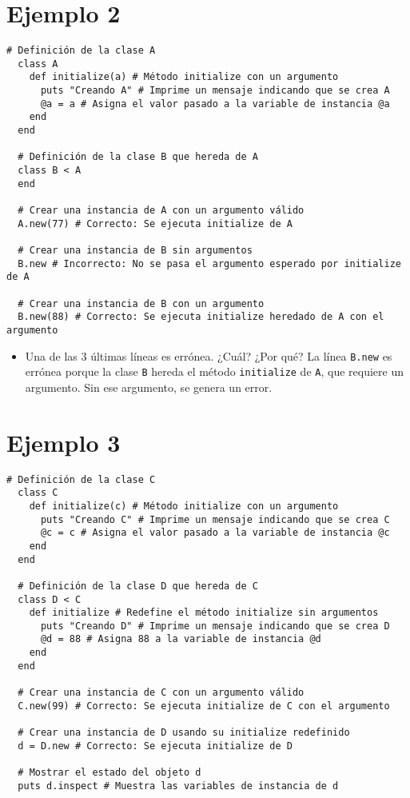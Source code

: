 \documentclass[a4paper,12pt]{article}
\begin{document}
\section{Ejemplo 2}

\begin{lstlisting}[style=customruby]
  # Definición de la clase A
  class A
    def initialize(a) # Método initialize con un argumento
      puts "Creando A" # Imprime un mensaje indicando que se crea A
      @a = a # Asigna el valor pasado a la variable de instancia @a
    end
  end
  
  # Definición de la clase B que hereda de A
  class B < A
  end
  
  # Crear una instancia de A con un argumento válido
  A.new(77) # Correcto: Se ejecuta initialize de A
  
  # Crear una instancia de B sin argumentos
  B.new # Incorrecto: No se pasa el argumento esperado por initialize de A
  
  # Crear una instancia de B con un argumento
  B.new(88) # Correcto: Se ejecuta initialize heredado de A con el argumento
  \end{lstlisting}
  
  \begin{itemize}
    \item Una de las 3 últimas líneas es errónea. ¿Cuál? ¿Por qué?  
          La línea \texttt{B.new} es errónea porque la clase \texttt{B} hereda el método \texttt{initialize} de \texttt{A}, que requiere un argumento. Sin ese argumento, se genera un error.
  \end{itemize}

\section{Ejemplo 3}
\begin{lstlisting}[style=customruby]
  # Definición de la clase C
  class C
    def initialize(c) # Método initialize con un argumento
      puts "Creando C" # Imprime un mensaje indicando que se crea C
      @c = c # Asigna el valor pasado a la variable de instancia @c
    end
  end
  
  # Definición de la clase D que hereda de C
  class D < C
    def initialize # Redefine el método initialize sin argumentos
      puts "Creando D" # Imprime un mensaje indicando que se crea D
      @d = 88 # Asigna 88 a la variable de instancia @d
    end
  end
  
  # Crear una instancia de C con un argumento válido
  C.new(99) # Correcto: Se ejecuta initialize de C con el argumento
  
  # Crear una instancia de D usando su initialize redefinido
  d = D.new # Correcto: Se ejecuta initialize de D
  
  # Mostrar el estado del objeto d
  puts d.inspect # Muestra las variables de instancia de d
  \end{lstlisting}
  
\end{document}
